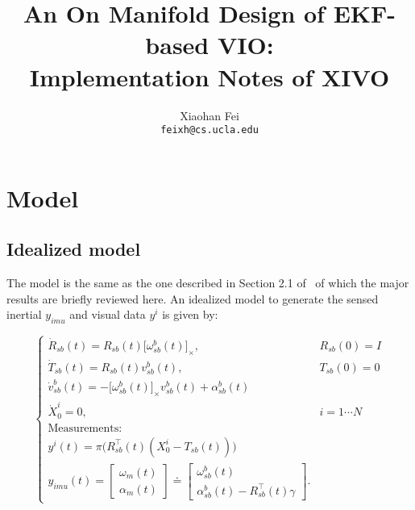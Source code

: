 \documentclass[letter,10pt]{article}
\title{An On Manifold Design of EKF-based VIO:\\
Implementation Notes of XIVO}
\author{Xiaohan Fei\\
\texttt{feixh@cs.ucla.edu}}
\newcommand{\asym}[1]{{\lbrack #1\rbrack}_\times{}}
\begin{document}
\maketitle


\section{Model}

\subsection{Idealized model}
The model is the same as the one described in Section 2.1 of~\cite{jonesS10IJRR} of which the major results are briefly reviewed here. An idealized model to generate the sensed inertial $y_{imu}$ and visual data $y^i$ is given by:

\begin{equation}
\begin{cases}
\dot{R}_{sb}(t)=R_{sb}(t)\asym{\omega_{sb}^b(t)}, &R_{sb}(0)=I\\
\dot{T}_{sb}(t)=R_{sb}(t)v_{sb}^b(t), &T_{sb}(0)=0\\
\dot{v}_{sb}^b(t)=-\asym{\omega_{sb}^b(t)}v_{sb}^b(t)+\alpha_{sb}^b(t)\\
\dot{X}_0^i=0, &i=1\cdots N\\
\text{Measurements:}\\
y^i(t)=\pi\big(R_{sb}^\top(t)(X_0^i-T_{sb}(t))\big)\\
y_{imu}(t)=
\begin{bmatrix}
 \omega_m(t)\\
 \alpha_m(t)
\end{bmatrix}
\doteq
\begin{bmatrix}
	    \omega_{sb}^b(t)\\
	    \alpha_{sb}^b(t)-R_{sb}^\top(t)\gamma
           \end{bmatrix}.
\end{cases}
\label{eq-ideal-model}
\end{equation}
\end{document}
